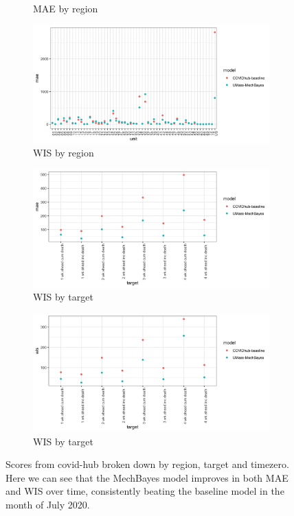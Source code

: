 \documentclass[11pt]{amsart}
\begin{document}
\begin{figure}
\begin{subfigure}{.5\textwidth}
    \caption{MAE by region}
\end{subfigure}%
\begin{subfigure}{.5\textwidth}
  \centering
    \includegraphics[scale=.1]{wis_results_by_region.png}
    \caption{WIS by region}
\end{subfigure}
\begin{subfigure}{.5\textwidth}
  \centering
    \includegraphics[scale=.1]{mae_results_by_target.png}
    \caption{WIS by target}
\end{subfigure}%
\begin{subfigure}{.5\textwidth}
  \centering
    \includegraphics[scale=.1]{wis_results_by_target.png}
    \caption{WIS by target}
\end{subfigure}%

\caption{Scores from covid-hub broken down by region, target and timezero. Here we can see that the MechBayes model improves in both MAE and WIS over time, consistently beating the baseline model in the month of July 2020.  }
\label{fig:covidhub}
\end{figure}
\end{document}
